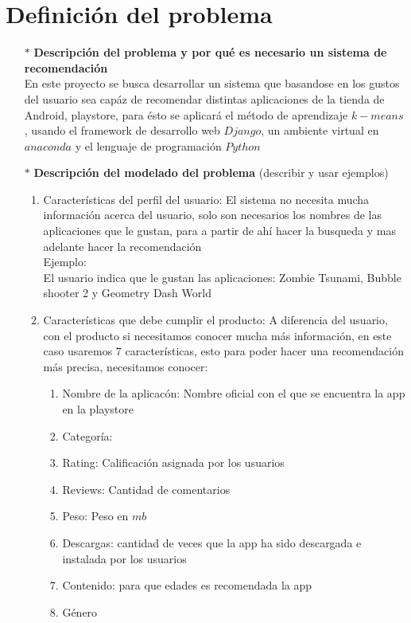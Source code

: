 \documentclass[10pt, a4paper]{article}
\begin{document}
\section{Definici\'on del problema}
\begin{enumerate}
\item[$\ast$]\textbf{Descripción del problema y por qué es necesario un sistema de recomendaci\'on} \\
En este proyecto se busca desarrollar un sistema que basandose en los gustos del usuario sea cap\'az de recomendar distintas aplicaciones de la tienda de Android, playstore, para \'esto se aplicar\'a el m\'etodo de aprendizaje $k-means$, usando el framework de desarrollo web $Django$, un ambiente virtual en $anaconda$ y el lenguaje de programaci\'on $Python$
\item[$\ast$]\textbf{Descripción del modelado del problema }(describir y usar ejemplos) \\
\begin{enumerate}
\item Características del perfil del usuario: El sistema no necesita mucha informaci\'on acerca del usuario, solo son necesarios los nombres de las aplicaciones que le gustan, para a partir de ah\'i hacer la busqueda y mas adelante hacer la recomendaci\'on\\
Ejemplo:\\
El usuario indica que le gustan las aplicaciones: Zombie Tsunami, Bubble shooter 2 y Geometry Dash World
\item Características que debe cumplir el producto: A diferencia del usuario, con el producto si necesitamos conocer mucha m\'as informaci\'on, en este caso usaremos 7 caracter\'isticas, esto para poder hacer una recomendaci\'on m\'as precisa, necesitamos conocer: \\
\begin{enumerate}
\item Nombre de la aplicac\'on: Nombre oficial con el que se encuentra la app en la playstore
\item Categor\'ia: 
\item Rating: Calificaci\'on asignada por los usuarios 
\item Reviews: Cantidad de comentarios
\item Peso: Peso en $mb$
\item Descargas: cantidad de veces que la app ha sido descargada e instalada por los usuarios
\item Contenido: para que edades es recomendada la app 
\item G\'enero

\end{enumerate}
\end{enumerate}
\end{enumerate}
\end{document}
